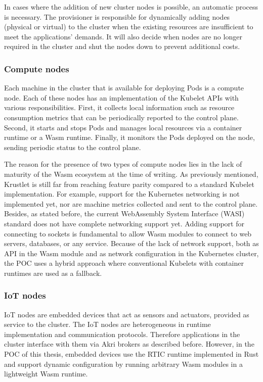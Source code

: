 In cases where the addition of new cluster nodes is possible, an automatic process is necessary. The provisioner is responsible for dynamically adding nodes (physical or virtual) to the cluster when the existing resources are insufficient to meet the applications' demands. It will also decide when nodes are no longer required in the cluster and shut the nodes down to prevent additional costs.

\subsubsection{Compute nodes}

Each machine in the cluster that is available for deploying Pods is a compute node. Each of these nodes has an implementation of the Kubelet APIs with various responsibilities. First, it collects local information such as resource consumption metrics that can be periodically reported to the control plane. Second, it starts and stops Pods and manages local resources via a container runtime or a Wasm runtime. Finally, it monitors the Pods deployed on the node, sending periodic status to the control plane.

The reason for the presence of two types of compute nodes lies in the lack of maturity of the Wasm ecosystem at the time of writing. As previously mentioned, Krustlet is still far from reaching feature parity compared to a standard Kubelet implementation. For example, support for the Kubernetes networking is not implemented yet, nor are machine metrics collected and sent to the control plane. Besides, as stated before, the current WebAssembly System Interface (WASI) standard does not have complete networking support yet. Adding support for connecting to sockets is fundamental to allow Wasm modules to connect to web servers, databases, or any service. Because of the lack of network support, both as API in the Wasm module and as network configuration in the Kubernetes cluster, the POC uses a hybrid approach where conventional Kubelets with container runtimes are used as a fallback.

\subsubsection{IoT nodes}

IoT nodes are embedded devices that act as sensors and actuators, provided as service to the cluster. The IoT nodes are heterogeneous in runtime implementation and communication protocols. Therefore applications in the cluster interface with them via Akri brokers as described before. However, in the POC of this thesis, embedded devices use the RTIC runtime implemented in Rust and support dynamic configuration by running arbitrary Wasm modules in a lightweight Wasm runtime.

